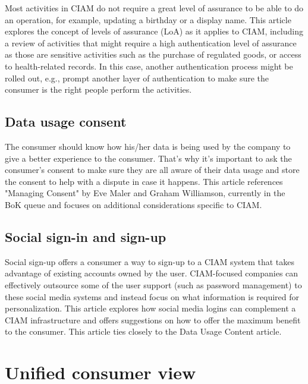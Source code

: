 Most activities in CIAM do not require a great level of assurance to be
able to do an operation, for example, updating a birthday or a display
name. This article explores the concept of levels of assurance (LoA) as
it applies to CIAM, including a review of activities that might require
a high authentication level of assurance as those are sensitive
activities such as the purchase of regulated goods, or access to
health-related records. In this case, another authentication process
might be rolled out, e.g., prompt another layer of authentication to
make sure the consumer is the right people perform the activities.~

\hypertarget{data-usage-consent}{%
\subsection{Data usage consent}\label{data-usage-consent}}

The consumer should know how his/her data is being used by the company
to give a better experience to the consumer. That's why it's important
to ask the consumer's consent to make sure they are all aware of their
data usage and store the consent to help with a dispute in case it
happens. This article references "Managing Consent" by Eve Maler and
Graham Williamson, currently in the BoK queue and focuses on additional
considerations specific to CIAM.

\hypertarget{social-sign-in-and-sign-up}{%
\subsection{Social sign-in and
sign-up}\label{social-sign-in-and-sign-up}}

Social sign-up offers a consumer a way to sign-up to a CIAM system that
takes advantage of existing accounts owned by the user. CIAM-focused
companies can effectively outsource some of the user support (such as
password management) to these social media systems and instead focus on
what information is required for personalization. This article explores
how social media logins can complement a CIAM infrastructure and offers
suggestions on how to offer the maximum benefit to the consumer. This
article ties closely to the Data Usage Content article.

\hypertarget{unified-consumer-view}{%
\section{Unified consumer view}\label{unified-consumer-view}}

